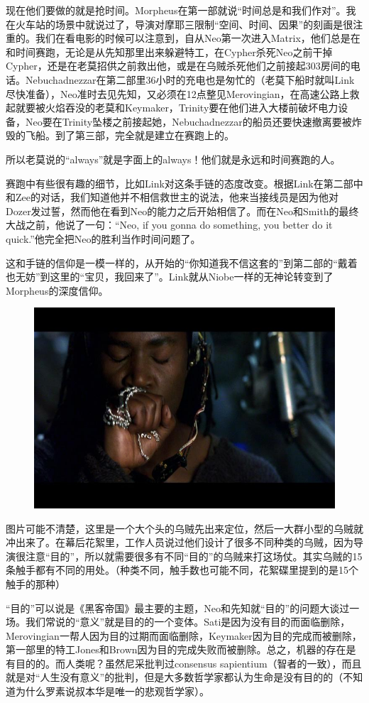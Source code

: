 \documentclass[UTF8]{ctexart}
\begin{document}
现在他们要做的就是抢时间。Morpheus在第一部就说“时间总是和我们作对”。我在火车站的场景中就说过了，导演对摩耶三限制“空间、时间、因果”的刻画是很注重的。我们在看电影的时候可以注意到，自从Neo第一次进入Matrix，他们总是在和时间赛跑，无论是从先知那里出来躲避特工，在Cypher杀死Neo之前干掉Cypher，还是在老莫招供之前救出他，或是在乌贼杀死他们之前接起303房间的电话。Nebuchadnezzar在第二部里36小时的充电也是匆忙的（老莫下船时就叫Link尽快准备），Neo准时去见先知，又必须在12点整见Merovingian，在高速公路上救起就要被火焰吞没的老莫和Keymaker，Trinity要在他们进入大楼前破坏电力设备，Neo要在Trinity坠楼之前接起她，Nebuchadnezzar的船员还要快速撤离要被炸毁的飞船。到了第三部，完全就是建立在赛跑上的。

所以老莫说的“always”就是字面上的always！他们就是永远和时间赛跑的人。

赛跑中有些很有趣的细节，比如Link对这条手链的态度改变。根据Link在第二部中和Zee的对话，我们知道他并不相信救世主的说法，他来当接线员是因为他对Dozer发过誓，然而他在看到Neo的能力之后开始相信了。而在Neo和Smith的最终大战之前，他说了一句：“Neo, if you gonna do something, you better do it quick.”他完全把Neo的胜利当作时间问题了。

这和手链的信仰是一模一样的，从开始的“你知道我不信这套的”到第二部的“戴着也无妨”到这里的“宝贝，我回来了”。Link就从Niobe一样的无神论转变到了Morpheus的深度信仰。

\begin{figure}[htb]
\centering
\includegraphics[width=0.5\linewidth]{fig/aea59e3d72117d00bba16754.jpg}
\end{figure}

图片可能不清楚，这里是一个大个头的乌贼先出来定位，然后一大群小型的乌贼就冲出来了。在幕后花絮里，工作人员说过他们设计了很多不同种类的乌贼，因为导演很注意“目的”，所以就需要很多有不同“目的”的乌贼来打这场仗。其实乌贼的15条触手都有不同的用处。（种类不同，触手数也可能不同，花絮碟里提到的是15个触手的那种）

“目的”可以说是《黑客帝国》最主要的主题，Neo和先知就“目的”的问题大谈过一场。我们常说的“意义”就是目的的一个变体。Sati是因为没有目的而面临删除，Merovingian一帮人因为目的过期而面临删除，Keymaker因为目的完成而被删除，第一部里的特工Jones和Brown因为目的完成失败而被删除。总之，机器的存在是有目的的。而人类呢？虽然尼采批判过consensus sapientium（智者的一致），而且就是对“人生没有意义”的批判，但是大多数哲学家都认为生命是没有目的的（不知道为什么罗素说叔本华是唯一的悲观哲学家）。
\end{document}
